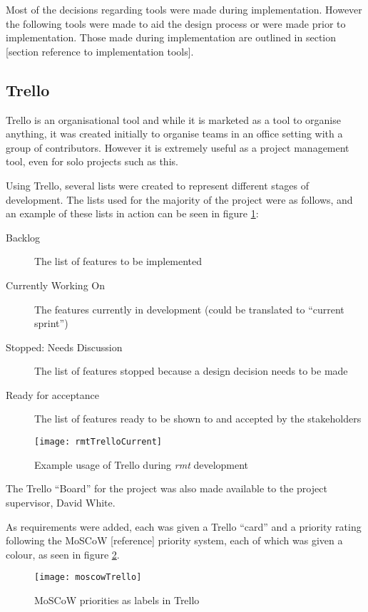 Most of the decisions regarding tools were made during implementation.
However the following tools were made to aid the design process or were made prior to implementation.
Those made during implementation are outlined in section [section reference to implementation tools].

\subsection{Trello}
Trello \citep{trello} is an organisational tool and while it is marketed as a tool to organise anything, it was created initially to organise teams in an office setting \citep{trellolaunch} with a group of contributors.
However it is extremely useful as a project management tool, even for solo projects such as this.

Using Trello, several lists were created to represent different stages of development.
The lists used for the majority of the project were as follows, and an example of these lists in action can be seen in figure \ref{fig:trello}:
\begin{description}
	\item[Backlog] The list of features to be implemented
	\item[Currently Working On] The features currently in development (could be translated to ``current sprint'')
	\item[Stopped: Needs Discussion] The list of features stopped because a design decision needs to be made
	\item[Ready for acceptance] The list of features ready to be shown to and accepted by the stakeholders
\end{description}

\begin{figure}[t]
	\centering
	\texttt{[image: rmtTrelloCurrent]}
	\caption{Example usage of Trello during \emph{rmt} development}
	\label{fig:trello}
\end{figure}

The Trello ``Board'' for the project was also made available to the project supervisor, David White.

As requirements were added, each was given a Trello ``card'' and a priority rating following the MoSCoW [reference] priority system, each of which was given a colour, as seen in figure \ref{fig:moscow}.

\begin{figure}[t]
	\centering
	\texttt{[image: moscowTrello]}
	\caption{MoSCoW priorities as labels in Trello}
	\label{fig:moscow}
\end{figure}

